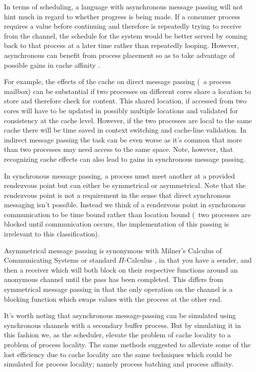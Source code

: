 In terms of scheduling, a language with asynchronous message passing will not 
hint much in regard to whether progress is being made. If a consumer process
requires a value before continuing and therefore is repeatedly trying to receive 
from the channel, the schedule for the system would be better served by coming 
back to that process at a later time rather than repeatedly looping. However,
asynchronous can benefit from process placement so as to take advantage of 
possible gains in cache affinity \cite{debattista2002cache}. 

For example, the 
effects of the cache on direct message passing (\eg~a process mailbox) can be 
substantial if two processes on different cores share a location to store and
therefore check for content. This shared location, if accessed from two cores
will have to be updated in possibly multiple locations and validated for 
consistency at the cache level. However, if the two processes are local to the 
same cache there will be time saved in context switching and cache-line validation. 
In indirect message passing the task can be even worse as it's common that more
than two processes may need access to the same space. Note, however, that recognizing
cache effects can also lead to gains in synchronous message passing.

In synchronous message passing, a process must meet another at a provided 
rendezvous point but can either be symmetrical or asymmetrical. Note that the 
rendezvous point is not a requirement in the sense that direct synchronous 
messaging isn't possible. Instead we think of a rendezvous point in synchronous 
communication to be time bound rather than location bound (\ie~two processes are 
blocked until communication occurs, the implementation of this passing is 
irrelevant to this classification).

Asymmetrical message passing is synonymous with Milner's Calculus of 
Communicating Systems \cite{milner1982calculus} or standard $\Pi$-Calculus 
\cite{palamidessi1997comparing}, in that you have a sender, and then a receiver 
which will both block on their respective functions around an anonymous channel 
until the pass has been completed. This differs from symmetrical message 
passing in that the only operation on the channel is a blocking function which 
swaps values with the process at the other end.

It's worth noting that asynchronous message-passing can be simulated using 
synchronous channels with a secondary buffer process. But by simulating it in 
this fashion we, as the scheduler, elevate the problem of cache locality to a
problem of process locality. The same methods suggested to alleviate some of the 
lost efficiency due to cache locality \cite{markatos1991load,markatos1991memory}
are the same techniques which could be simulated for process locality; namely
process batching and process affinity.

